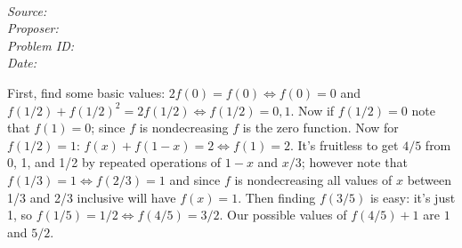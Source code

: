   
\SSbreak\\
\emph{Source: \Cop}\\
\emph{Proposer: \Paiya}\\ %
\emph{Problem ID:}\\
\emph{Date: }\\
\SSbreak

\bigskip

\begin{solution}\hfil\medskip
	
	First, find some basic values: $2f(0) = f(0) \iff f(0) = 0$ and $f(1/2) + f(1/2)^2 = 2f(1/2) \iff f(1/2) = 0, 1$. Now if $f(1/2) = 0$ note that $f(1) = 0$; since $f$ is nondecreasing $f$ is the zero function. Now for $f(1/2) = 1$: $f(x) + f(1 - x) = 2 \iff f(1) = 2$. It's fruitless to get $4/5$ from 0, 1, and 1/2 by repeated operations of $1 - x$ and $x/3$; however note that $f(1/3) = 1 \iff f(2/3) = 1$ and since $f$ is nondecreasing all values of $x$ between 1/3 and 2/3 inclusive will have $f(x) = 1$. Then finding $f(3/5)$ is easy: it's just 1, so $f(1/5) = 1/2 \iff f(4/5) = 3/2$. Our possible values of $f(4/5) + 1$ are $1$ and $5/2$.
\end{solution}\bigskip